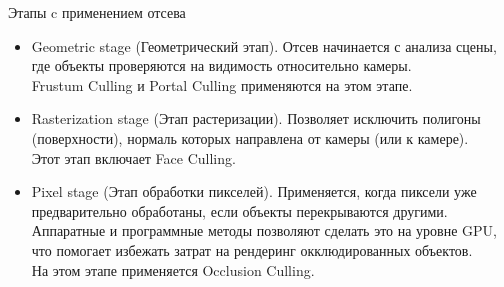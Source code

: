 \documentclass{beamer}
\begin{document}
	\begin{frame}{Этапы c применением отсева}
		\begin{itemize}
			\item 			
			Geometric stage (Геометрический этап). Отсев начинается с анализа сцены, где объекты проверяются на видимость относительно камеры. \\ Frustum Culling и Portal Culling применяются на этом этапе.
			\item 
			Rasterization stage (Этап растеризации). 
			Позволяет исключить полигоны (поверхности), нормаль которых направлена от камеры (или к камере). \\
			Этот этап включает Face Culling. 
			\item 
			Pixel stage (Этап обработки пикселей). Применяется, когда
			пиксели уже предварительно обработаны, если объекты перекрываются другими. Аппаратные и программные методы позволяют сделать это на уровне GPU, что помогает избежать затрат на рендеринг окклюдированных объектов. \\
			На этом этапе применяется Occlusion Culling.
		\end{itemize}

	




	\end{frame}
\end{document}
